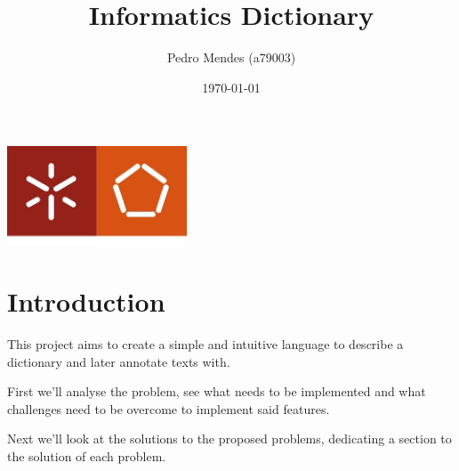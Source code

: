 \documentclass[a4paper]{report}
\begin{document}
\title{Informatics Dictionary}
\author{Pedro Mendes (a79003)}
\date{\today}

\begin{center}
    \begin{minipage}{0.75\linewidth}
        \centering
        \includegraphics[width=0.4\textwidth]{eng.jpeg}\par\vspace{1cm}
        \vspace{1.5cm}
        \href{https://www.uminho.pt/PT}
        {\color{black}{\scshape\LARGE Universidade do Minho}} \par
        \vspace{1cm}
        \href{https://www.di.uminho.pt/}
        {\color{black}{\scshape\Large Departamento de Informática}} \par
        \vspace{1.5cm}
        \maketitle
    \end{minipage}
\end{center}

\begin{abstract}
    \begin{center}
    \end{center}
\end{abstract}

\tableofcontents

\pagebreak

\chapter{Introduction}

This project aims to create a simple and intuitive language to describe a
dictionary and later annotate texts with.

First we'll analyse the problem, see what needs to be implemented and what
challenges need to be overcome to implement said features.

Next we'll look at the solutions to the proposed problems, dedicating a
section to the solution of each problem.
\end{document}
